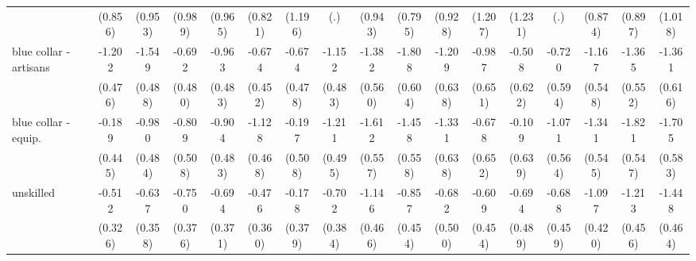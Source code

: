 {\begin{tabular}{l*{16}{c}}
                    &     (0.856)         &     (0.953)         &     (0.989)         &     (0.965)         &     (0.821)         &     (1.196)         &         (.)         &     (0.943)         &     (0.795)         &     (0.928)         &     (1.207)         &     (1.231)         &         (.)         &     (0.874)         &     (0.897)         &     (1.018)         \\
[1em]
blue collar - artisans&      -1.202\sym{*}  &      -1.549\sym{**} &      -0.692         &      -0.963\sym{*}  &      -0.674         &      -0.674         &      -1.152\sym{*}  &      -1.382\sym{*}  &      -1.808\sym{**} &      -1.209         &      -0.987         &      -0.508         &      -0.720         &      -1.167\sym{*}  &      -1.365\sym{*}  &      -1.361\sym{*}  \\
                    &     (0.476)         &     (0.488)         &     (0.480)         &     (0.483)         &     (0.452)         &     (0.478)         &     (0.483)         &     (0.560)         &     (0.604)         &     (0.638)         &     (0.651)         &     (0.622)         &     (0.594)         &     (0.548)         &     (0.552)         &     (0.616)         \\
[1em]
blue collar - equip.&      -0.189         &      -0.980\sym{*}  &      -0.809         &      -0.904         &      -1.128\sym{*}  &      -0.197         &      -1.211\sym{*}  &      -1.612\sym{**} &      -1.458\sym{**} &      -1.331\sym{*}  &      -0.678         &      -0.109         &      -1.071         &      -1.341\sym{*}  &      -1.821\sym{***}&      -1.705\sym{**} \\
                    &     (0.445)         &     (0.484)         &     (0.508)         &     (0.483)         &     (0.468)         &     (0.508)         &     (0.495)         &     (0.557)         &     (0.558)         &     (0.638)         &     (0.652)         &     (0.639)         &     (0.564)         &     (0.545)         &     (0.547)         &     (0.583)         \\
[1em]
unskilled           &      -0.512         &      -0.637         &      -0.750\sym{*}  &      -0.694         &      -0.476         &      -0.178         &      -0.702         &      -1.146\sym{*}  &      -0.857         &      -0.682         &      -0.609         &      -0.694         &      -0.688         &      -1.097\sym{**} &      -1.213\sym{**} &      -1.448\sym{**} \\
                    &     (0.326)         &     (0.358)         &     (0.376)         &     (0.371)         &     (0.360)         &     (0.379)         &     (0.384)         &     (0.466)         &     (0.454)         &     (0.500)         &     (0.454)         &     (0.489)         &     (0.459)         &     (0.420)         &     (0.456)         &     (0.464)         \\

\end{tabular}}
